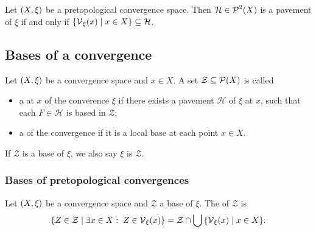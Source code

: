 \begin{lemma}
Let $\sSet{X,\xi}$ be a pretopological convergence space. Then $\mathcal{H}\in\operatorname{\mathcal{P}}^2(X)$ is a pavement of $\xi$ \textup{if and only if} $\setbuilder{\vicinity_\xi(x)}{x\in X} \subseteq \mathcal{H}$.
\end{lemma}

\subsection{Bases of a convergence}
\begin{definition}
Let $\sSet{X,\xi}$ be a convergence space and $x\in X$. A set $\mathcal{Z}\subseteq \operatorname{\mathcal{P}}(X)$ is called
\begin{itemize}
\item a  at $x$ of the converence $\xi$ if there exists a pavement $\mathcal{H}$ of $\xi$ at $x$, such that each $F\in\mathcal{H}$ is based in $\mathcal{Z}$;
\item a  of the convergence if it is a local base at each point $x\in X$.
\end{itemize}
If $\mathcal{Z}$ is a base of $\xi$, we also say $\xi$ is  $\mathcal{Z}$.
\end{definition}


\subsubsection{Bases of pretopological convergences}
\begin{definition}
Let $\sSet{X,\xi}$ be a convergence space and $\mathcal{Z}$ a base of $\xi$. The  of $\mathcal{Z}$ is
\[ \setbuilder{Z\in \mathcal{Z}}{\exists x\in X: \; Z\in \vicinity_\xi(x)} = \mathcal{Z}\cap \bigcup\setbuilder{\vicinity_\xi(x)}{x\in X}. \]
\end{definition}


